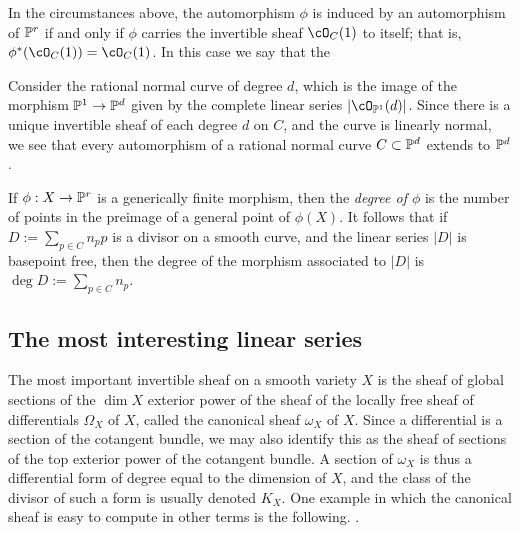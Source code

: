 \begin{exercise}\label{projective automorphism}
In the circumstances above, the automorphism $\phi$ is induced by an automorphism of $\PP^r$ if and only if $\phi$ carries the invertible sheaf $\cO_{C}(1)$ to itself; that is, $\phi^*(\cO_{C}(1)) = \cO_{C}(1)$. In this case we say that the
\end{exercise}

\begin{example}
Consider the rational normal curve of degree $d$, which is the image of the morphism $\PP^1\to \PP^d$ given by the complete linear series $|\cO_{\PP^1}(d)|$. Since there is a unique invertible sheaf of each degree $d$ on $C$, and the curve is linearly normal, we see that every automorphism of a rational normal curve $C \subset \PP^d$  extends to $\PP^d$.
\end{example}

If $\phi:X \to \PP^r$ is a generically finite morphism, then the \emph{degree of $\phi$} is the number of points in the preimage of a general point of $\phi(X)$. It follows that if $D := \sum_{p\in C} n_pp$ is a divisor on a smooth curve, and the linear series $|D|$ is basepoint free, then the degree of the morphism associated to $|D|$ is $\deg D := \sum_{p\in C} n_p$.

\subsection{The most interesting linear series}

The most important invertible sheaf on a smooth variety $X$ is the sheaf of global sections of the $\dim X$ exterior power of the   sheaf of the locally free sheaf of differentials $\Omega_X$ of $X$, called the canonical sheaf $\omega_X$ of $X$.  Since a differential
is a section of the cotangent bundle, we may also identify this as the sheaf of sections of the top exterior power of the 
cotangent bundle. A section of 
$\omega_X$ is thus a differential form of degree equal to the dimension of $X$, and the class of the divisor
of such a form is usually denoted $K_X$. One example in which the canonical sheaf is easy to compute in other terms is the following. .

